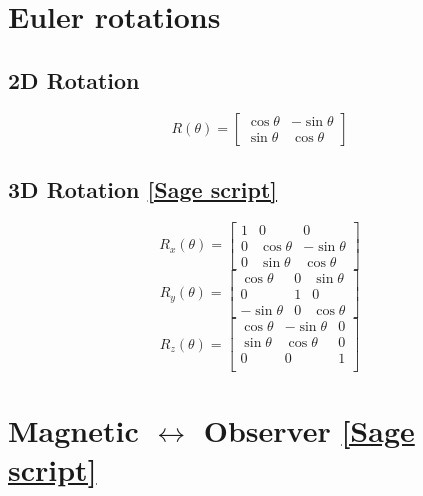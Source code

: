 \documentclass{book}
\newcommand{\linktosage}[1]{\hyperref[#1]{[Sage script]}}
\begin{document}
\section{Euler rotations}

\subsection{2D Rotation}

\begin{equation}
    R(\theta) = \begin{bmatrix}
        \cos\theta & -\sin\theta \\
        \sin\theta & \cos\theta
    \end{bmatrix}
\end{equation}

\subsection{3D Rotation \linktosage{sage:3Drotation}}

\begin{equation}
    R_x(\theta) = \begin{bmatrix}
        1 & 0 & 0 \\
        0 & \cos\theta & -\sin\theta \\
        0 & \sin\theta & \cos\theta
    \end{bmatrix}
\end{equation}
\begin{equation}
    R_y(\theta) = \begin{bmatrix}
        \cos\theta & 0 & \sin\theta \\
        0 & 1 & 0 \\
        -\sin\theta & 0 & \cos\theta
    \end{bmatrix}
\end{equation}
\begin{equation}
    R_z(\theta) = \begin{bmatrix}
        \cos\theta & -\sin\theta & 0 \\
        \sin\theta & \cos\theta & 0 \\
        0 & 0 & 1 \\
    \end{bmatrix}
\end{equation}

\section{Magnetic $\leftrightarrow$ Observer \linktosage{sage:mag2obs}}
\end{document}
